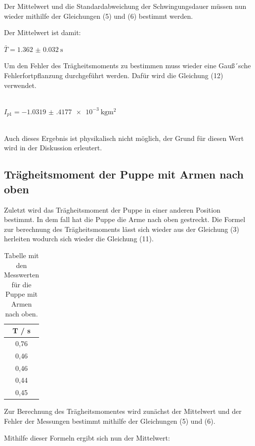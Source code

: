 Der Mittelwert und die Standardabweichung der Schwingungsdauer müssen nun wieder
mithilfe der Gleichungen (5) und (6) bestimmt werden.

Der Mittelwert ist damit:

\centerline{$\bar{T} = \SI{1.362(32)}{\second}$}

Um den Fehler des Trägheitsmoments zu bestimmen muss wieder eine Gauß´sche
Fehlerfortpflanzung durchgeführt werden. Dafür wird die Gleichung (12) verwendet.\\\\


\centerline{$I_{p1} = \SI{-1.0319(4177)e-3}{\kilo\gram\meter\squared}$}\ \\

Auch dieses Ergebnis ist physikalisch nicht möglich, der Grund für diesen Wert wird
in der Diskussion erleutert.

\subsection{Trägheitsmoment der Puppe mit Armen nach oben}

Zuletzt wird das Trägheitsmoment der Puppe in einer anderen Position bestimmt. In dem
fall hat die Puppe die Arme nach oben gestreckt. Die Formel zur berechnung des
Trägheitsmoments lässt sich wieder aus der Gleichung (3) herleiten wodurch sich wieder
die Gleichung (11).



\begin{table}[H]
  \centering
  \caption{Tabelle mit den Messwerten für die Puppe mit Armen nach oben.}
  \begin{tabular}{c}
    \toprule
    T / \si{\second} \\
    \midrule
    0,76 \\
    0,46 \\
    0,46 \\
    0,44 \\
    0,45 \\
    \bottomrule
  \end{tabular}
\end{table}

Zur Berechnung des Trägheitsmomentes wird zunächst der Mittelwert und der Fehler
der Messungen bestimmt mithilfe der Gleichungen (5) und (6).


Mithilfe dieser Formeln ergibt sich nun der Mittelwert:\\\\

